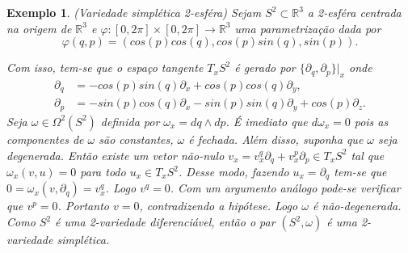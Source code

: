 \documentclass[12pt]{book}
\newtheorem{exemplo}[teorema]{Exemplo}
\newcommand{\derivadaparcialabrev}[1]{\partial_{#1}}
\newcommand{\real}[1]{\mathbb{R}^{#1}}
\begin{document}
	\begin{exemplo}
		(Variedade simplética 2-esféra) Sejam $S^{2} \subset \real{3}$ a 2-esféra centrada na origem de $\real{3}$ e $\varphi:[0,2\pi]\times [0,2\pi] \to \real{3}$ uma parametrização dada por 
		$$
		\varphi(q, p) = (cos (p) cos (q), cos (p) sin (q), sin (p)).
		$$
		
		Com isso, tem-se que o espaço tangente $T_{x}S^{2} $ é gerado por $ \{\derivadaparcialabrev{ q}, \derivadaparcialabrev{ p} \}|_{x}$ onde
		$$
		\begin{aligned}
		\derivadaparcialabrev{ q} &= -cos (p)sin (q) \derivadaparcialabrev{x}+ cos (p)cos (q) \derivadaparcialabrev{y},
		\\
		\derivadaparcialabrev{ p} &=  - sin (p) cos (q) 	\derivadaparcialabrev{x} - sin (p) sin (q) 	\derivadaparcialabrev{y} +cos (p)				\derivadaparcialabrev{z}.
		\end{aligned} 
		$$
		Seja $\omega\in \Omega^{2}(S^{2})$ definida por $\omega_{x} = dq \wedge dp$. É imediato que $d\omega_{x} = 0$ pois as componentes de $\omega$ são constantes, $\omega$ é fechada. Além disso, suponha que $\omega$ seja degenerada. Então existe um vetor não-nulo $v_{x} = v^{q}_{x}\partial_{q}+v^{p}_{x}\partial_{p} \in T_{x}S^{2}$ tal que $\omega_{x}(v, u)=0$ para todo $u_{x}\in T_{x}S^{2}$. Desse modo, fazendo $u_{x} = \partial_{q}$ tem-se que $0=\omega_{x}(v, \partial_{q}) = v^{q}_{x}$. Logo $v^{q}=0$. Com um argumento análogo pode-se verificar que $v^{p}=0$. Portanto $v=0$, contradizendo a hipótese. Logo $\omega$ é não-degenerada. Como $S^{2}$ é uma 2-variedade diferenciável, então o par $(S^{2}, \omega)$ é uma 2-variedade simplética.
	\end{exemplo}
	
\end{document}

